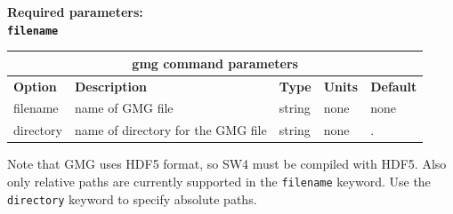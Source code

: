 \documentclass[11pt]{report}
\begin{document}
{\begin{flushleft}
	\bf Required parameters:\\
	\tt filename
\end{flushleft}
%
\begin{center}
	\begin{tabular}{|l|p{8cm}|l|l||l|} \hline
		\multicolumn{5}{|c|}{\bf gmg command parameters}                                             \\ \hline
		{\bf Option} & {\bf Description}                  & {\bf Type} & {\bf Units} & {\bf Default} \\ \hline
		\hline
		filename     & name of GMG file                   & string     & none        & none          \\ \hline
		directory    & name of directory for the GMG file & string     & none        & .             \\ \hline
	\end{tabular}
\end{center}
Note that GMG uses HDF5 format, so SW4 must be compiled with HDF5. Also only relative paths are currently supported in the \verb+filename+ keyword. Use the
\verb+directory+ keyword to specify absolute paths.



}
\end{document}
